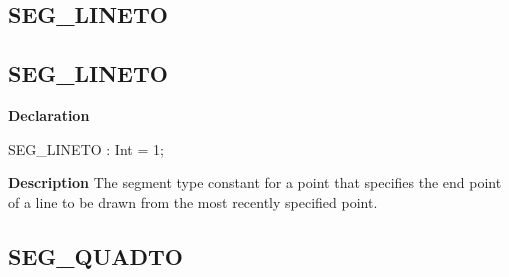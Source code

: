 \documentclass{report}
\newif\ifpdf
\begin{document}
\subsection*{\large{\textbf{SEG{\_}LINETO}}\normalsize\hspace{1ex}\hrulefill}
\else
\subsection*{SEG{\_}LINETO}
\fi
\label{NewPascal.GUI.Geom-SEG_LINETO}
\begin{list}{}{
\setlength{\itemindent}{0cm}
\setlength{\listparindent}{0cm}
\setlength{\leftmargin}{\evensidemargin}
\addtolength{\leftmargin}{\tmplength}
\settowidth{\labelsep}{X}
\addtolength{\leftmargin}{\labelsep}
\setlength{\labelwidth}{\tmplength}
}
\item[\textbf{Declaration}\hfill]
\ifpdf
\begin{flushleft}
\fi
\begin{ttfamily}
SEG{\_}LINETO     : Int = 1;\end{ttfamily}

\ifpdf
\end{flushleft}
\fi

\par
\item[\textbf{Description}]
The segment type constant for a point that specifies the end point of a line to be drawn from the most recently specified point.

\end{list}
\ifpdf
\subsection*{\large{\textbf{SEG{\_}QUADTO}}\normalsize\hspace{1ex}\hrulefill}
\else
\end{document}
